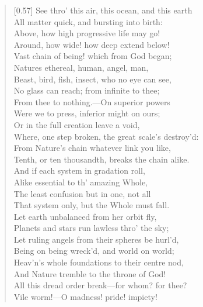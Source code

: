 \begin{verse}[0.57\textwidth]
See thro' this air, this ocean, and this earth\\
All matter quick, and bursting into birth:\\
Above, how high progressive life may go!\\
Around, how wide! how deep extend below!\\
Vast chain of being! which from God began;\\
Natures ethereal, human, angel, man,\\
Beast, bird, fish, insect, who no eye can see,\\
No glass can reach; from infinite to thee;\\
From thee to nothing.---On superior powers\\
Were we to press, inferior might on ours;\\
Or in the full creation leave a void,\\
Where, one step broken, the great scale's destroy'd:\\
From Nature's chain whatever link you like,\\
Tenth, or ten thousandth, breaks the chain alike.\\
\vin And if each system in gradation roll,\\
Alike essential to th' amazing Whole,\\
The least confusion but in one, not all\\
That system only, but the Whole must fall.\\
Let earth unbalanced from her orbit fly,\\
Planets and stars run lawless thro' the sky;\\
Let ruling angels from their spheres be hurl'd,\\
Being on being wreck'd, and world on world;\\
Heav'n's whole foundations to their centre nod,\\
And Nature tremble to the throne of God!\\
All this dread order break---for whom? for thee?\\
Vile worm!---O madness! pride! impiety!


\end{verse}

